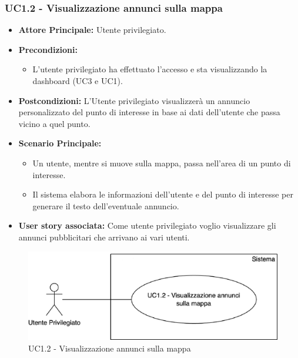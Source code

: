 \documentclass[11pt]{article}
\begin{document}
\begin{justify}
\subsubsection{\textbf{UC1.2 - Visualizzazione annunci sulla mappa}}
\begin{itemize}
    \item \textbf{Attore Principale:} Utente privilegiato.
    \item \textbf{Precondizioni:} 
        \begin{itemize}
    	\item L'utente privilegiato ha effettuato l'accesso e sta          visualizzando la dashboard (UC3 e UC1).
        \end{itemize}
    \item \textbf{Postcondizioni:} L'Utente privilegiato visualizzerà un annuncio personalizzato del punto di interesse in base ai dati dell'utente che passa vicino a quel punto.
    \item \textbf{Scenario Principale:} 
        \begin{itemize}
    	\item Un utente, mentre si muove sulla mappa, passa nell'area      di un punto di interesse.
    	\item Il sistema elabora le informazioni dell'utente e del         punto di interesse per generare il testo dell'eventuale            annuncio.
	\end{itemize}
    \item \textbf{User story associata:} Come utente privilegiato voglio visualizzare gli annunci pubblicitari che arrivano ai vari utenti.
\end{itemize}
\begin{figure}[ht]
    \centering
    \includegraphics[width=0.5\linewidth]{UC1.2image.png}
    \caption{UC1.2 - Visualizzazione annunci sulla mappa}
    \label{fig:UC1.2}
\end{figure}

\end{justify}
\end{document}
